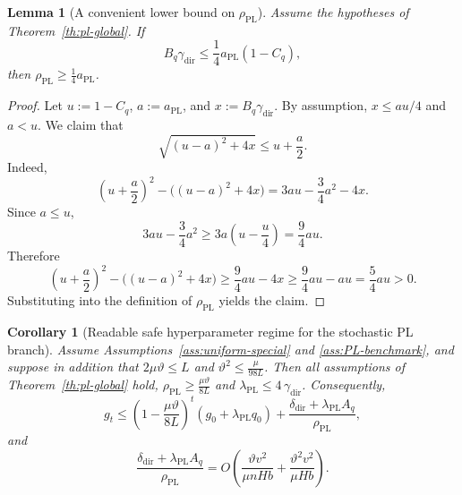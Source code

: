 \documentclass{article}
\newtheorem{lemma}[theorem]{Lemma}
\newtheorem{corollary}[theorem]{Corollary}
\theoremstyle{definition}
\begin{document}
\begin{lemma}[A convenient lower bound on $\rho_{\mathrm{PL}}$]
\label{lem:rho-lower}
Assume the hypotheses of Theorem~\ref{th:pl-global}. If
\[
B_q\gamma_{\mathrm{dir}}\le \frac14 a_{\mathrm{PL}}(1-C_q),
\]
then $\rho_{\mathrm{PL}}\ge \frac14 a_{\mathrm{PL}}$.
\end{lemma}

\begin{proof}
Let $u:=1-C_q$, $a:=a_{\mathrm{PL}}$, and $x:=B_q\gamma_{\mathrm{dir}}$. By
assumption, $x\le au/4$ and $a<u$. We claim that
\[
\sqrt{(u-a)^2+4x}\le u+\frac{a}{2}.
\]
Indeed,
\[
\left(u+\frac{a}{2}\right)^2-\bigl((u-a)^2+4x\bigr)
=
3au-\frac34 a^2-4x.
\]
Since $a\le u$,
\[
3au-\frac34a^2
\ge
3a\left(u-\frac{u}{4}\right)=\frac94 au.
\]
Therefore
\[
\left(u+\frac{a}{2}\right)^2-\bigl((u-a)^2+4x\bigr)
\ge
\frac94au-4x
\ge
\frac94au-au
=
\frac54au>0.
\]
Substituting into the definition of $\rho_{\mathrm{PL}}$ yields the claim.
\end{proof}

\begin{corollary}[Readable safe hyperparameter regime for the stochastic PL branch]
\label{cor:pl-safe}
Assume Assumptions~\ref{ass:uniform-special} and \ref{ass:PL-benchmark}, and
suppose in addition that $2 \mu\vartheta\le L$ and $\vartheta^2\le \frac{\mu}{98L}$.
Then all assumptions of Theorem~\ref{th:pl-global} hold, $
\rho_{\mathrm{PL}}\ge \frac{\mu\vartheta}{8L}$ and
$\lambda_{\mathrm{PL}}\le 4\,\gamma_{\mathrm{dir}}$.
Consequently,
\[
g_t
\le
\left(1-\frac{\mu\vartheta}{8L}\right)^t
\left(g_0+\lambda_{\mathrm{PL}}q_0\right)
+
\frac{\delta_{\mathrm{dir}}+\lambda_{\mathrm{PL}}A_q}{\rho_{\mathrm{PL}}},
\]
and
\[
\frac{\delta_{\mathrm{dir}}+\lambda_{\mathrm{PL}}A_q}{\rho_{\mathrm{PL}}}
=
O\!\left(\frac{\vartheta v^2}{\mu n H b}+\frac{\vartheta^2 v^2}{\mu H b}\right).
\]
\end{corollary}
\end{document}

